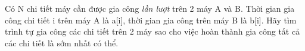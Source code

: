 Có N chi tiết máy cần được gia công   \textit{    lần lượt   }   trên 2 máy A và B. Thời gian gia công chi tiết i trên máy A là a[i], thời gian gia công trên máy B là b[i]. Hãy tìm trình tự gia công các chi tiết trên 2 máy sao cho việc hoàn thành gia công tất cả các chi tiết là sớm nhất có thể.  

\